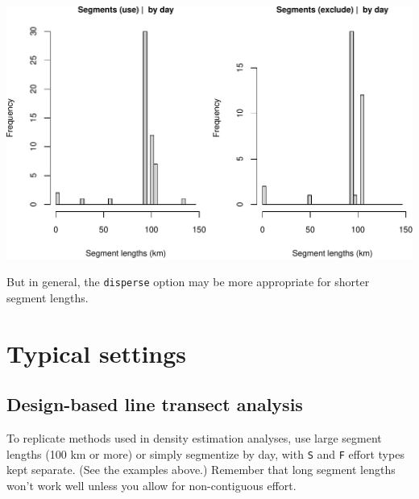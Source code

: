 \documentclass[
]{book}
\newenvironment{Shaded}{\begin{snugshade}}{\end{snugshade}}
\newcommand{\CommentTok}[1]{\textcolor[rgb]{0.56,0.35,0.01}{\textit{#1}}}
\newcommand{\DataTypeTok}[1]{\textcolor[rgb]{0.13,0.29,0.53}{#1}}
\newcommand{\DecValTok}[1]{\textcolor[rgb]{0.00,0.00,0.81}{#1}}
\newcommand{\KeywordTok}[1]{\textcolor[rgb]{0.13,0.29,0.53}{\textbf{#1}}}
\newcommand{\NormalTok}[1]{#1}
\newcommand{\OperatorTok}[1]{\textcolor[rgb]{0.81,0.36,0.00}{\textbf{#1}}}
\newcommand{\OtherTok}[1]{\textcolor[rgb]{0.56,0.35,0.01}{#1}}
\newcommand{\StringTok}[1]{\textcolor[rgb]{0.31,0.60,0.02}{#1}}
\begin{document}
\begin{Shaded}
\end{Shaded}

\includegraphics{figures/unnamed-chunk-66-1.pdf}

But in general, the \texttt{disperse} option may be more appropriate for shorter segment lengths.

\hypertarget{typical-settings}{%
\section*{Typical settings}\label{typical-settings}}

\hypertarget{design-based-line-transect-analysis}{%
\subsection*{Design-based line transect analysis}\label{design-based-line-transect-analysis}}

To replicate methods used in density estimation analyses, use large segment lengths (100 km or more) or simply segmentize by day, with \texttt{S} and \texttt{F} effort types kept separate. (See the examples above.) Remember that long segment lengths won't work well unless you allow for non-contiguous effort.
\end{document}
